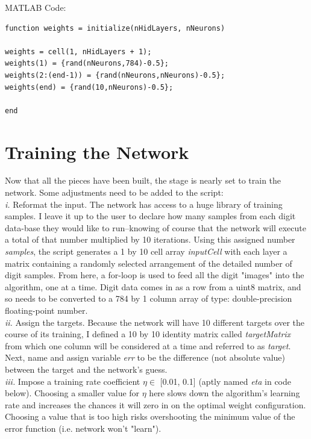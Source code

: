 \documentclass[letterpaper,11pt]{article}
\begin{document}
\vspace{5mm}
MATLAB Code:

\begin{verbatim}
function weights = initialize(nHidLayers, nNeurons)

weights = cell(1, nHidLayers + 1);
weights(1) = {rand(nNeurons,784)-0.5};
weights(2:(end-1)) = {rand(nNeurons,nNeurons)-0.5};
weights(end) = {rand(10,nNeurons)-0.5};

end
\end{verbatim}



\section{Training the Network}

Now that all the pieces have been built, the stage is nearly set to train the network. Some adjustments need to be added to the script:\\

\emph{i.} Reformat the input. The network has access to a huge library of training samples. I leave it up to the user to declare how many samples from each digit data-base they would like to run--knowing of course that the network will execute a total of that number multiplied by 10 iterations. Using this assigned number \emph{samples}, the script generates a 1 by 10 cell array \emph{inputCell} with each layer a matrix containing a randomly selected arrangement of the detailed number of digit samples. From here, a for-loop is used to feed all the digit "images" into the algorithm, one at a time. Digit data comes in as a row from a uint8 matrix, and so needs to be converted to a 784 by 1 column array of type: double-precision floating-point number.\\

\emph{ii.} Assign the targets. Because the network will have 10 different targets over the course of its training, I defined a 10 by 10 identity matrix called \emph{targetMatrix} from which one column will be considered at a time and referred to as \emph{target}. Next, name and assign variable \emph{err} to be the difference (not absolute value) between the target and the network's guess.\\

\emph{iii.} Impose a training rate coefficient $\eta \in$ [0.01, 0.1] (aptly named \emph{eta} in code below). Choosing a smaller value for $\eta$ here slows down the algorithm's learning rate and increases the chances it will zero in on the optimal weight configuration. Choosing a value that is too high risks overshooting the minimum value of the error function (i.e. network won't "learn").\\
\end{document}
